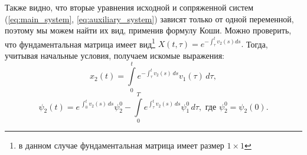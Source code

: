 Также видно, что вторые уравнения исходной и сопряженной систем (\ref{eq:main_system}, \ref{eq:auxiliary_system}) зависят только от одной переменной, поэтому мы можем найти их вид, применив формулу Коши. Можно проверить, что фундаментальная матрица имеет вид\footnote{в данном случае фундаментальная матрица имеет размер $1 \times 1$}
$
        X(t, \tau) = e^{-\int_\tau^t v_2(s) ds}.
$
Тогда, учитывая начальные условия, получаем искомые выражения:
\begin{equation} \label{eq:x_2}
        x_2(t) = \int\limits_0^t e^{-\int_\tau^t v_2(s)\,ds} v_1(\tau)\,d\tau,
\end{equation}
\begin{equation} \label{eq:psi_2}
        \psi_2(t) = e^{\,\int_0^t v_2(s)\,ds}\psi_2^0 - \int\limits_0^T e^{\int_\tau^t v_2(s)\,ds} \psi_1^0\,d\tau,\mbox{ где $\psi_2^0 = \psi_2(0)$.}
\end{equation}

